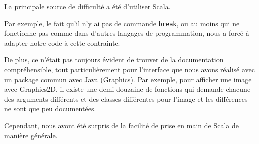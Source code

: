 \documentclass[10pt,a4paper]{article}
\begin{document}
La principale source de difficulté a été d'utiliser Scala.

Par exemple, le fait qu'il n'y ai pas de commande \texttt{break}, ou au moins qui ne fonctionne pas comme dans d'autres langages de programmation, nous a forcé à adapter notre code à cette contrainte.

De plus, ce n'était pas toujours évident de trouver de la documentation compréhensible, tout particulièrement pour l'interface que nous avons réalisé avec un package commun avec Java (Graphics). Par exemple, pour afficher une image avec Graphics2D, il existe une demi-douzaine de fonctions qui demande chacune des arguments différents et des classes différentes pour l'image et les différences ne sont que peu documentées.

Cependant, nous avont été surpris de la facilité de prise en main de Scala de manière générale.
\end{document}
